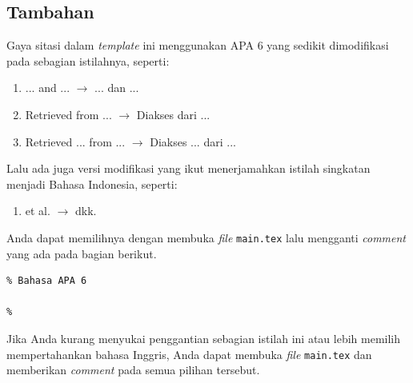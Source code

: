 \subsection{Tambahan}

Gaya sitasi dalam \textit{template} ini menggunakan APA 6 yang sedikit dimodifikasi pada sebagian istilahnya, seperti:

\begin{enumerate}[nosep]
    \item ... and ... $\longrightarrow$ ... dan ...
    \item Retrieved from ... $\longrightarrow$ Diakses dari ...
    \item Retrieved ... from ... $\longrightarrow$ Diakses ... dari ...
\end{enumerate}

Lalu ada juga versi modifikasi yang ikut menerjamahkan istilah singkatan menjadi Bahasa Indonesia, seperti:

\begin{enumerate}[nosep]
    \item et al. $\longrightarrow$ dkk.
\end{enumerate}

Anda dapat memilihnya dengan membuka \textit{file} \texttt{main.tex} lalu mengganti \textit{comment} yang ada pada bagian berikut.

\begin{lstlisting}
% Bahasa APA 6

%
\end{lstlisting}

Jika Anda kurang menyukai penggantian sebagian istilah ini atau lebih memilih mempertahankan bahasa Inggris, Anda dapat membuka \textit{file} \texttt{main.tex} dan memberikan \textit{comment} pada semua pilihan tersebut.